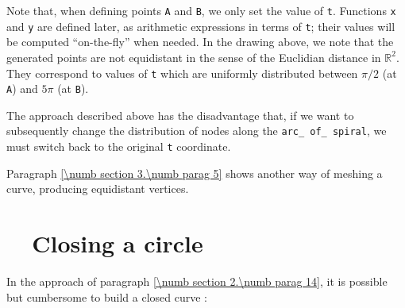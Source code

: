 Note that, when defining points {\small\tt A} and {\small\tt B}, we only set the value of {\small\tt t}.
Functions {\small\tt x} and {\small\tt y} are defined later, as arithmetic expressions in terms of
{\small\tt t}; their values will be computed ``on-the-fly'' when needed.
In the drawing above, we note that the generated points are not equidistant in the sense of the
Euclidian distance in $ \mathbb{R}^2 $.
They correspond to values of {\small\tt t} which are uniformly distributed between
$ \pi/2 $ (at {\small\tt A}) and $ 5\pi $ (at {\small\tt B}).

The approach described above has the disadvantage that, if we want to subsequently change the
distribution of nodes along the {\small\tt arc\_\,of\_\,spiral}, we must switch back to the original
{\small\tt t} coordinate.

Paragraph \ref{\numb section 3.\numb parag 5} shows another way of meshing a curve,
producing equidistant vertices.


\section{~~Closing a circle}\label{\numb section 2.\numb parag 15}

In the approach of paragraph \ref{\numb section 2.\numb parag 14}, it is possible but cumbersome to
build a closed curve :

